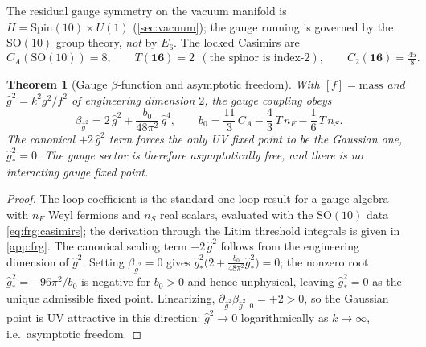 \documentclass[11pt]{article}
\theoremstyle{plain}
\newtheorem{theorem}{Theorem}[section]
\theoremstyle{definition}
\theoremstyle{remark}
\begin{document}
The residual gauge symmetry on the vacuum manifold is $H=\mathrm{Spin}(10)\times U(1)$
(\autoref{sec:vacuum}); the gauge running is governed by the
\emph{$\mathrm{SO}(10)$} group theory, \emph{not} by $E_{6}$. The locked
Casimirs are
\begin{equation}\label{eq:frg:casimirs}
  C_{A}\!\left(\mathrm{SO}(10)\right)=8,\qquad
  T(\mathbf{16})=2\ \ (\text{the spinor is index-}2),\qquad
  C_{2}(\mathbf{16})=\tfrac{45}{8}.
\end{equation}

\begin{theorem}[Gauge $\beta$-function and asymptotic freedom]
\label{thm:frg:gauge}
With $[f]=\text{mass}$ and $\hat g^{2}=k^{2}g^{2}/f^{2}$ of engineering
dimension $2$, the gauge coupling obeys
\begin{equation}\label{eq:frg:betag}
  \beta_{\hat g^{2}}
  = 2\,\hat g^{2}
    + \frac{b_{0}}{48\pi^{2}}\,\hat g^{4},
  \qquad
  b_{0}=\frac{11}{3}\,C_{A}-\frac{4}{3}\,T\,n_{F}-\frac16\,T\,n_{S}.
\end{equation}
The canonical $+2\,\hat g^{2}$ term forces the only UV fixed point to be
the \emph{Gaussian} one, $\hat g^{2}_{\ast}=0$. The gauge sector is
therefore asymptotically free, and there is no interacting gauge fixed
point.
\end{theorem}

\begin{proof}
The loop coefficient is the standard one-loop result for a gauge algebra
with $n_{F}$ Weyl fermions and $n_{S}$ real scalars, evaluated with the
$\mathrm{SO}(10)$ data \eqref{eq:frg:casimirs}; the derivation through the
Litim threshold integrals is given in \autoref{app:frg}. The canonical
scaling term $+2\,\hat g^{2}$ follows from the engineering dimension of
$\hat g^{2}$. Setting $\beta_{\hat g^{2}}=0$ gives
$\hat g^{2}_{\ast}\bigl(2+\tfrac{b_{0}}{48\pi^{2}}\hat g^{2}_{\ast}\bigr)=0$;
the nonzero root $\hat g^{2}_{\ast}=-96\pi^{2}/b_{0}$ is negative for
$b_{0}>0$ and hence unphysical, leaving $\hat g^{2}_{\ast}=0$ as the unique
admissible fixed point. Linearizing, $\partial_{\hat g^{2}}\beta_{\hat g^{2}}|_{0}=+2>0$,
so the Gaussian point is UV attractive in this direction: $\hat g^{2}\to0$
logarithmically as $k\to\infty$, i.e.\ asymptotic freedom.
\end{proof}
\end{document}
